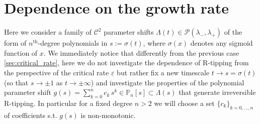 \documentclass[../main.tex]{subfiles}
\begin{document}
\section{Dependence on the growth rate}\label{sec:critical_growth}

Here we consider a family of $\mathcal{C}^{2}$ parameter shifts $\Lambda(t)\in \mathcal{P}(\lambda_{-},\lambda_{+})$ of the form of $n^{\text{th}}$-degree polynomials in $s:=\sigma(t)$, where $\sigma(x)$ denotes any sigmoid function of $x$.
We immediately notice that differently from the previous case \ref{sec:critical_rate}, here we do not investigate the dependence of R-tipping from the perspective of the critical rate $\varepsilon$ but rather fix a new timescale $t\to s =\sigma(t)$ (so that $s\to\pm1$ as $t\to\pm\infty$) and investigate the properties of the polynomial parameter shift $g(s) = \sum_{k=0}^{n}c_{k}\,s^{k}\in\mathbb{P}_{n}[s]\subset\Lambda(s)$ that generate irreversible R-tipping.
In particular for a fixed degree $n>2$ we will choose a set $\{c_{k}\}_{k=0,...,n}$ of coefficients s.t. $g(s)$ is non-monotonic.



\end{document}
